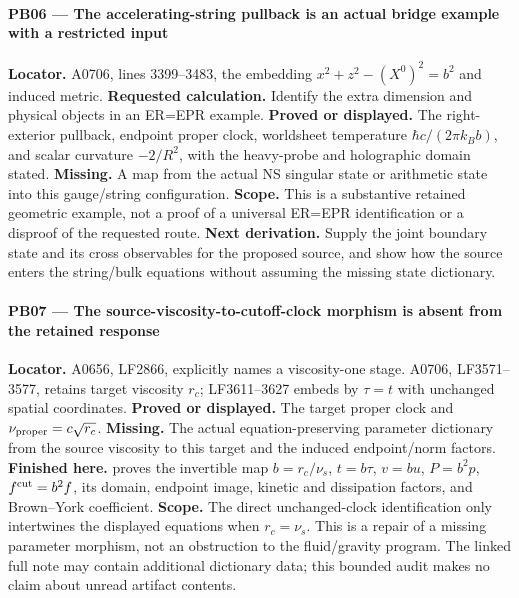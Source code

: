 \paragraph{PB06 --- The accelerating-string pullback is an actual bridge
example with a restricted
input}\label{TranscriptLedgerStage:pb06-the-accelerating-string-pullback-is-an-actual-bridge-example-with-a-restricted-input}

\textbf{Locator.} A0706, lines 3399--3483, the embedding
\(x^2+z^2-(X^0)^2=b^2\) and induced metric. \textbf{Requested
calculation.} Identify the extra dimension and physical objects in an
ER=EPR example. \textbf{Proved or displayed.} The right-exterior
pullback, endpoint proper clock, worldsheet temperature
\(\hbar c/(2\pi k_Bb)\), and scalar curvature \(-2/R^2\), with the
heavy-probe and holographic domain stated. \textbf{Missing.} A map from
the actual NS singular state or arithmetic state into this gauge/string
configuration. \textbf{Scope.} This is a substantive retained geometric
example, not a proof of a universal ER=EPR identification or a disproof
of the requested route. \textbf{Next derivation.} Supply the joint
boundary state and its cross observables for the proposed source, and
show how the source enters the string/bulk equations without assuming
the missing state dictionary.

\paragraph{PB07 --- The source-viscosity-to-cutoff-clock morphism is
absent from the retained
response}\label{TranscriptLedgerStage:pb07-the-source-viscosity-to-cutoff-clock-morphism-is-absent-from-the-retained-response}

\textbf{Locator.} A0656, LF2866, explicitly names a viscosity-one stage.
A0706, LF3571--3577, retains target viscosity \(r_c\); LF3611--3627
embeds by \(\tau=t\) with unchanged spatial coordinates. \textbf{Proved
or displayed.} The target proper clock and
\(\nu_{\rm proper}=c\sqrt{r_c}\). \textbf{Missing.} The actual
equation-preserving parameter dictionary from the source viscosity to
this target and the induced endpoint/norm factors. \textbf{Finished
here.} \protect{} proves the invertible map
\(b=r_c/\nu_s\), \(t=b\tau\), \(v=bu\), \(P=b^2p\),
\(f^{\rm cut}=b^2f\), its domain, endpoint image, kinetic and
dissipation factors, and Brown--York coefficient. \textbf{Scope.} The
direct unchanged-clock identification only intertwines the displayed
equations when \(r_c=\nu_s\). This is a repair of a missing parameter
morphism, not an obstruction to the fluid/gravity program. The linked
full note may contain additional dictionary data; this bounded audit
makes no claim about unread artifact contents.

